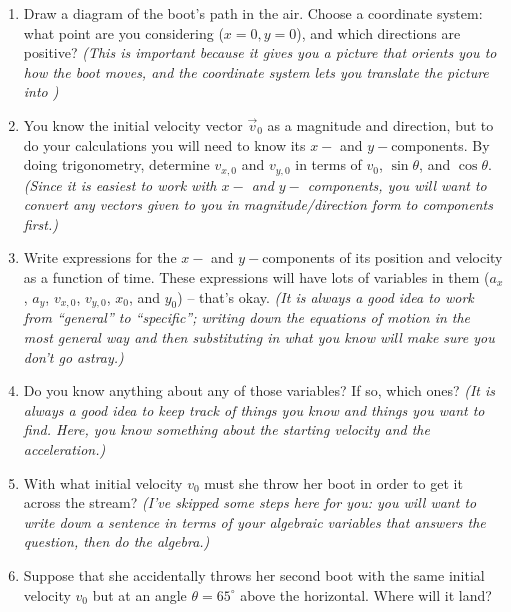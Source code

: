 \documentclass[12pt]{article}
\begin{document}
\begin{enumerate}

\item Draw a diagram of the boot's path in the air. Choose a coordinate system: what point are you considering ($x=0, y=0$), and which directions are positive? {\it (This is important because it gives you a picture that orients you to how the boot moves, and the coordinate system lets you translate the picture into )}

\vspace{2in}
\newpage
\item You know the initial velocity vector $\vec v_0$ as a magnitude and direction, but to do your calculations you will need to know its $x-$ and $y-$components. By doing trigonometry,
determine $v_{x,0}$ and $v_{y,0}$ in terms of $v_0$, $\sin \theta$, and $\cos \theta$. {\it (Since it is easiest to work with $x-$ and $y-$ components, you will want to convert any vectors given to you in magnitude/direction form to components first.)}

\vspace{2in}

\item Write expressions for the $x-$ and $y-$components of its position and velocity as a function of time. These expressions will have lots of variables in them ($a_x$, $a_y$, $v_{x,0}$, $v_{y,0}$, $x_0$, and $y_0$) -- that's okay. {\it (It is always a good idea to work from ``general'' to ``specific''; writing down the equations of motion in the most general way and then substituting in what you know will make sure you don't go astray.)}

\vspace{2in}

\item Do you know anything about any of those variables? If so, which ones? {\it (It is always a good idea to keep track of things you know and things you want to find. Here, you know something about the starting velocity and the acceleration.)}

\newpage


\item With what initial velocity $v_0$ must she throw her boot in order to get it across the stream? {\it (I've skipped some steps here for you: you will want to write down a sentence in terms of your algebraic variables that answers the question, then do the algebra.)}

\vspace{3in}

\item Suppose that she accidentally throws her second boot with the same initial velocity $v_0$ but at an angle $\theta = 65^\circ$ above the horizontal. Where will it land?

\vspace{2in}

\end{enumerate}
\end{document}

